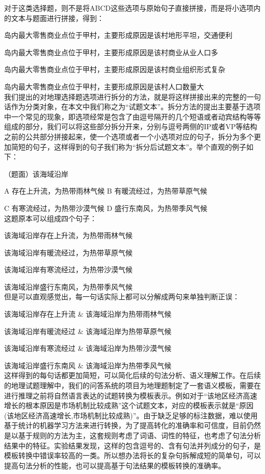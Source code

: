 \documentclass[master, winfont]{njuthesis}
\begin{document}
对于这类选择题，则不是将ABCD这些选项与原始句子直接拼接，而是将小选项内的文本与题面进行拼接，得到：\par
岛内最大零售商业点位于甲村，主要形成原因是该村地形平坦，交通便利\par
岛内最大零售商业点位于甲村，主要形成原因是该村商业从业人口多\par
岛内最大零售商业点位于甲村，主要形成原因是该村商业组织形式复杂\par
岛内最大零售商业点位于甲村，主要形成原因是该村人口数量大\\

我们提出的对地理选择题选项进行拆分的方法，就是将这样拼接出来的完整的一句话作为分类对象，在本文中我们称之为“试题文本”。拆分方法的提出主要基于选项中一个常见的现象，即选项经常是包含了由逗号隔开的几个短语或者动宾结构等等组成的部分，我们可以将这些部分拆分开来，分别与逗号两侧的IP或者VP等结构之前的公共部分拼接起来，使一个选项或者一个小选项对应的句子，拆分为多个更加简短的句子，这样得到的句子我们称为“拆分后试题文本”。举个直观的例子如下：

（题面）该海域沿岸 \par
A 存在上升流，为热带雨林气候   B 有暖流经过，为热带草原气候\par
C 有寒流经过，为热带沙漠气候   D 盛行东南风，为热带季风气候\\

这题原本可以组成四个句子：\par
该海域沿岸存在上升流，为热带雨林气候\par
该海域沿岸有暖流经过，为热带草原气候\par
该海域沿岸有寒流经过，为热带沙漠气候\par
该海域沿岸盛行东南风，为热带季风气候\\

但是可以直观感觉出，每一句话实际上都可以分解成两句来单独判断正误：\par
该海域沿岸存在上升流 \& 该海域沿岸为热带雨林气候\par
该海域沿岸有暖流经过 \& 该海域沿岸为热带草原气候\par
该海域沿岸有寒流经过 \& 该海域沿岸为热带沙漠气候\par
该海域沿岸盛行东南风 \& 该海域沿岸为热带季风气候\\

这样得到的每句话都更加简短，可以简化后续的句法分析、语义理解工作。在后续的地理试题理解中，我们的问答系统的项目为地理题制定了一套语义模板，需要在进行推理之前将自然语言表达的试题转换为模板表示。例如对于“该地区经济高速增长的根本原因是市场机制比较成熟”这个试题文本，对应的模板表示就是“原因(该地区经济高速增长,市场机制比较成熟)”。由于缺乏足够的标注数据，难以使用基于统计的机器学习方法来进行转换，为了提高转化的准确率和可信度，目前仍然是以基于规则的方法为主，这套规则考虑了词语、词性的特征，也考虑了句法分析结果中的特征。实验结果发现，这样的包含逗号的、含有句法并列成分的句子，是模板转换中错误率较高的一类。所以想办法将长的复杂句拆解成短的简单句，可以提高句法分析的性能，也可以提高基于句法结果的模板转换的准确率。
\end{document}
